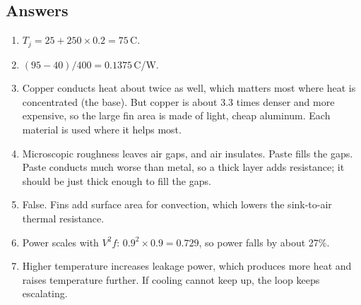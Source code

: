 \subsection*{Answers}
\begin{enumerate}
  \item $T_j = 25 + 250 \times 0.2 = 75$\,\textdegree C.
  \item $(95 - 40)/400 = 0.1375$\,\textdegree C/W.
  \item Copper conducts heat about twice as well, which matters most where heat is concentrated (the base). But copper is about 3.3 times denser and more expensive, so the large fin area is made of light, cheap aluminum. Each material is used where it helps most.
  \item Microscopic roughness leaves air gaps, and air insulates. Paste fills the gaps. Paste conducts much worse than metal, so a thick layer adds resistance; it should be just thick enough to fill the gaps.
  \item False. Fins add surface area for convection, which lowers the sink-to-air thermal resistance.
  \item Power scales with $V^2 f$: $0.9^2 \times 0.9 = 0.729$, so power falls by about 27\%.
  \item Higher temperature increases leakage power, which produces more heat and raises temperature further. If cooling cannot keep up, the loop keeps escalating.
\end{enumerate}
